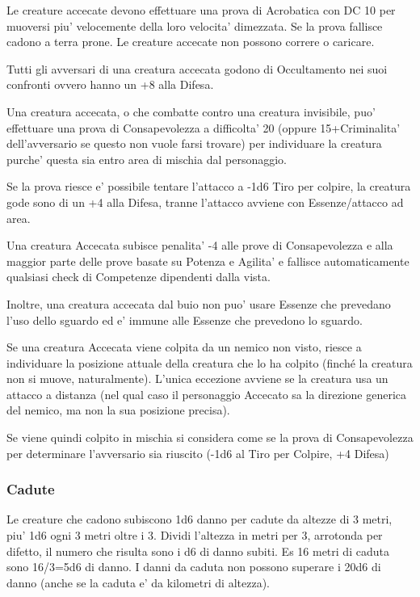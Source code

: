 \documentclass[a4paper,11pt,twoside,openany]{book}
\begin{document}
{Le creature accecate devono effettuare una prova di Acrobatica con DC 10 per muoversi piu' velocemente della loro velocita' dimezzata. Se la prova fallisce cadono a terra prone. Le creature accecate non possono correre o caricare.

Tutti gli avversari di una creatura accecata godono di Occultamento nei suoi confronti ovvero hanno un +8 alla Difesa.

Una creatura accecata, o che combatte contro una creatura invisibile, puo' effettuare una prova di Consapevolezza a difficolta' 20 (oppure 15+Criminalita' dell'avversario se questo non vuole farsi trovare) per individuare la creatura purche' questa sia entro area di mischia dal personaggio.

Se la prova riesce e' possibile tentare l'attacco a -1d6 Tiro per colpire, la creatura gode sono di un +4 alla Difesa, tranne l'attacco avviene con Essenze/attacco ad area.

Una creatura Accecata subisce penalita' -4 alle prove di Consapevolezza e alla maggior parte delle prove basate su Potenza e Agilita' e fallisce automaticamente qualsiasi check di Competenze dipendenti dalla vista. 

Inoltre, una creatura accecata dal buio non puo' usare Essenze che prevedano l'uso dello sguardo ed e' immune alle Essenze che prevedono lo sguardo.

Se una creatura Accecata viene colpita da un nemico non visto, riesce a individuare la posizione attuale della creatura che lo ha colpito (finché la creatura non si muove, naturalmente). L'unica eccezione avviene se la creatura usa un attacco a distanza (nel qual caso il personaggio Accecato sa la direzione generica del nemico, ma non la sua posizione precisa).

Se viene quindi colpito in mischia si considera come se la prova di Consapevolezza per determinare l'avversario sia riuscito (-1d6 al Tiro per Colpire, +4 Difesa)

\subsubsection{Cadute}

\label{cadute}

Le creature che cadono subiscono 1d6 danno per cadute da altezze di 3 metri, piu' 1d6 ogni 3 metri oltre i 3. Dividi l'altezza in metri per 3, arrotonda per difetto, il numero che risulta sono i d6 di danno subiti. Es 16 metri di caduta sono 16/3=5d6 di danno. I danni da caduta non possono superare i 20d6 di danno (anche se la caduta e' da kilometri di altezza).

}
\end{document}
